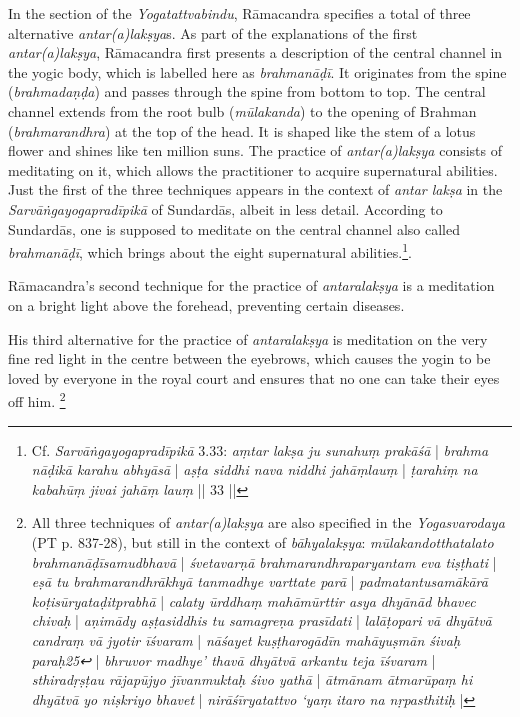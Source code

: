 In the  section of the \textit{Yogatattvabindu}, Rāmacandra specifies a total of three alternative \textit{antar(a)lakṣya}s. 
As part of the explanations of the first \textit{antar(a)lakṣya}, Rāmacandra first presents a description of the central channel in the yogic body, which is labelled here as \textit{brahmanāḍī}. It originates from the spine (\textit{brahmadaṇḍa}) and passes through the spine from bottom to top. The central channel extends from the root bulb (\textit{mūlakanda}) to the opening of Brahman (\textit{brahmarandhra}) at the top of the head. It is shaped like the stem of a lotus flower and shines like ten million suns. The practice of \textit{antar(a)lakṣya} consists of meditating on it, which allows the practitioner to acquire supernatural abilities. Just the first of the three techniques appears in the context of \textit{antar lakṣa} in the \textit{Sarvāṅgayogapradīpikā} of Sundardās, albeit in less detail. According to Sundardās, one is supposed to meditate on the central channel also called \textit{brahmanāḍī}, which brings about the eight supernatural abilities.\footnote{Cf. \textit{Sarvāṅgayogapradīpikā} 3.33: \textit{aṃtar lakṣa ju sunahuṃ prakāśā} | \textit{brahma nāḍikā karahu abhyāsā} | \textit{aṣṭa siddhi nava niddhi jahāṃlauṃ} | \textit{ṭarahiṃ na kabahūṃ jivai jahāṃ lauṃ} || 33 ||}.

Rāmacandra’s second technique for the practice of \textit{antaralakṣya} is a meditation on a bright light above the forehead, preventing certain diseases.

His third alternative for the practice of \textit{antaralakṣya} is meditation on the very fine red light in the centre between the eyebrows, which causes the yogin to be loved by everyone in the royal court and ensures that no one can take their eyes off him. \footnote{All three techniques of \textit{antar(a)lakṣya} are also specified in the \textit{Yogasvarodaya} (PT p. 837-28), but still in the context of \textit{bāhyalakṣya}: \textit{mūlakandotthatalato brahmanāḍīsamudbhavā} | \textit{śvetavarṇā brahmarandhraparyantam eva tiṣṭhati} | \textit{eṣā tu brahmarandhrākhyā tanmadhye varttate parā} | \textit{padmatantusamākārā koṭisūryataḍitprabhā} | \textit{calaty ūrddhaṃ mahāmūrttir asya dhyānād bhavec chivaḥ} | \textit{aṇimādy aṣṭasiddhis tu samagreṇa prasīdati} | \textit{lalāṭopari vā dhyātvā candraṃ vā jyotir īśvaram} | \textit{nāśayet kuṣṭharogādīn mahāyuṣmān śivaḥ paraḥ25↩} | \textit{bhruvor madhye’ thavā dhyātvā arkantu teja īśvaram} | \textit{sthiradṛṣṭau rājapūjyo jīvanmuktaḥ śivo yathā} | \textit{ātmānam ātmarūpaṃ hi dhyātvā yo niṣkriyo bhavet} | \textit{nirāśīryatattvo ‘yaṃ itaro na nṛpasthitiḥ} |}  

